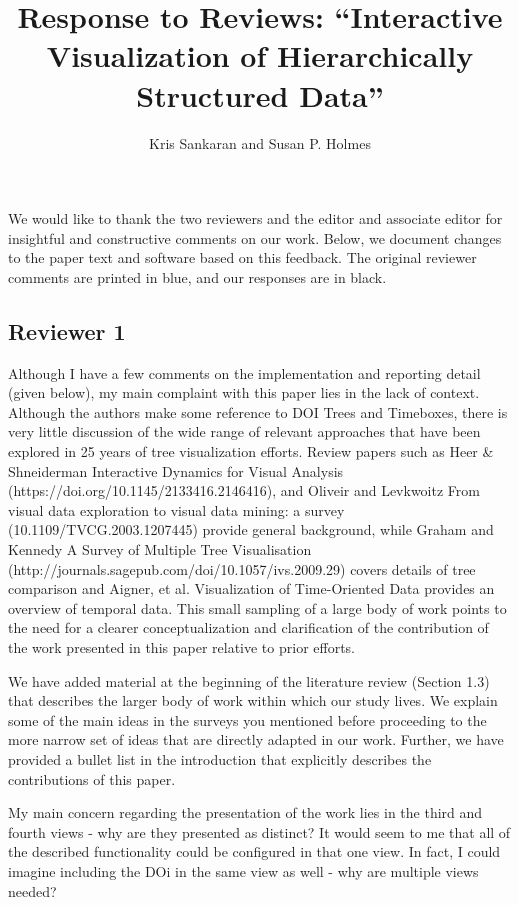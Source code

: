 \documentclass{article}
\title{Response to Reviews: ``Interactive Visualization of Hierarchically Structured Data''}
\author{Kris Sankaran and Susan P. Holmes}
\begin{document}
\maketitle

We would like to thank the two reviewers and the editor and associate editor for
insightful and constructive comments on our work. Below, we document changes to
the paper text and software based on this feedback. The original reviewer
comments are printed in blue, and our responses are in black.

\subsection{Reviewer 1}

\color{blue}

Although I have a few comments on the implementation and reporting detail (given
below), my main complaint with this paper lies in the lack of context. Although
the authors make some reference to DOI Trees and Timeboxes, there is very little
discussion of the wide range of relevant approaches that have been explored in
25 years of tree visualization efforts. Review papers such as Heer \&
Shneiderman Interactive Dynamics for Visual Analysis
(https://doi.org/10.1145/2133416.2146416), and Oliveir and Levkwoitz From visual
data exploration to visual data mining: a survey (10.1109/TVCG.2003.1207445)
provide general background, while Graham and Kennedy A Survey of Multiple Tree
Visualisation (http://journals.sagepub.com/doi/10.1057/ivs.2009.29) covers
details of tree comparison and Aigner, et al. Visualization of Time-Oriented
Data provides an overview of temporal data. This small sampling of a large body
of work points to the need for a clearer conceptualization and clarification of
the contribution of the work presented in this paper relative to prior efforts.

\color{black}

We have added material at the beginning of the literature review (Section 1.3) that
describes the larger body of work within which our study lives. We explain some of
the main ideas in the surveys you mentioned before proceeding to the more narrow
set of ideas that are directly adapted in our work. Further, we have provided a
bullet list in the introduction that explicitly describes the contributions of
this paper.

\color{blue}

My main concern regarding the presentation of the work lies in the third and
fourth views - why are they presented as distinct? It would seem to me that all
of the described functionality could be configured in that one view. In fact, I
could imagine including the DOi in the same view as well - why are multiple
views needed?
\end{document}
